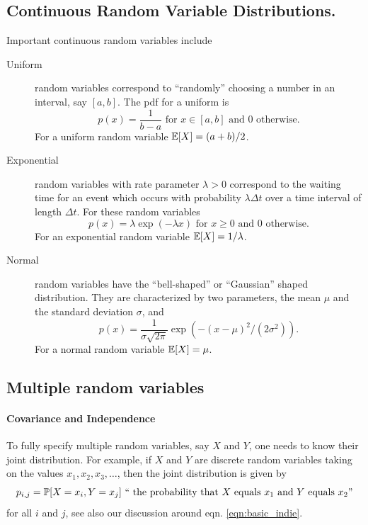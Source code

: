 \subsection{Continuous Random Variable Distributions.}
Important continuous random variables include
\begin{description}
\item[Uniform] random variables correspond to ``randomly'' choosing a number in an interval, say $[a,b]$. The pdf for a uniform is 
\begin{equation}
p(x)=\frac{1}{b-a} \mbox{ for }x\in[a,b]\mbox{ and } 0 \mbox{ otherwise.}
\end{equation}
For a uniform random variable $\E[X]=(a+b)/2$.
\item[Exponential] random variables with rate parameter $\lambda>0$ correspond to the waiting time for an event which occurs with probability $\lambda \Delta t$ over a time interval of length $\Delta t$. For these random variables
\begin{equation}
p(x)= \lambda \exp(-\lambda x) \mbox{ for }x\ge 0 \mbox{ and } 0
\mbox{ otherwise.}  \label{eqn:exp_rv_def}
\end{equation}
For an exponential random variable $\E[X]=1/\lambda$. 

\item[Normal] random variables have the ``bell-shaped'' or ``Gaussian'' shaped distribution. They are characterized by two parameters, the mean $\mu$ and the standard deviation $\sigma$, and
\begin{equation}
p(x)=\frac{1}{\sigma\sqrt{2\pi}}\exp(-(x-\mu)^2/(2\sigma^2)).
\end{equation}
For a normal random variable $\E[X]=\mu$. 
\end{description}

\subsection*{Multiple random variables} \label{section:multi_RV}

\paragraph{Covariance and Independence} To fully specify multiple random variables, say $X$ and $Y$, one needs to know their joint distribution. For example, if $X$ and $Y$ are discrete random variables taking on the values $x_1,x_2,x_3,\dots$, then the joint distribution is given by 
\begin{equation}
p_{i,j}=\P[X=x_i,Y=x_j] \mbox{ `` the probability that $X$ equals $x_1$ and $Y$ equals $x_2$''}
\end{equation}
for all $i$ and $j$, see also our discussion around eqn. \eqref{eqn:basic_indie}.

